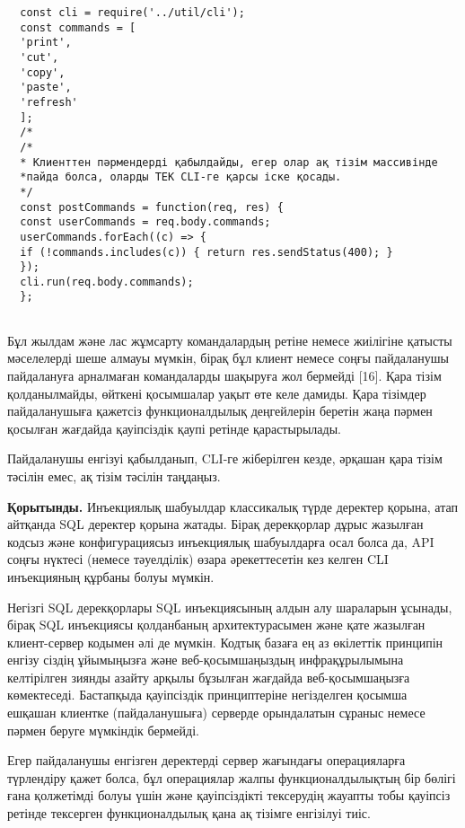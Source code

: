 \begin{verbatim}
  const cli = require('../util/cli');
  const commands = [
  'print',
  'cut',
  'copy',
  'paste',
  'refresh'
  ];
  /*
  /*
  * Клиенттен пәрмендерді қабылдайды, егер олар ақ тізім массивінде 
  *пайда болса, оларды ТЕК CLI-ге қарсы іске қосады.
  */
  const postCommands = function(req, res) {
  const userCommands = req.body.commands;
  userCommands.forEach((c) => {
  if (!commands.includes(c)) { return res.sendStatus(400); }
  });
  cli.run(req.body.commands);
  };
  

\end{verbatim}
\begin{multicols}{2}

Бұл жылдам және лас жұмсарту командалардың ретіне немесе жиілігіне
қатысты мәселелерді шеше алмауы мүмкін, бірақ бұл клиент немесе соңғы
пайдаланушы пайдалануға арналмаған командаларды шақыруға жол бермейді
{[}16{]}. Қара тізім қолданылмайды, өйткені қосымшалар уақыт өте келе
дамиды. Қара тізімдер пайдаланушыға қажетсіз функционалдылық деңгейлерін
беретін жаңа пәрмен қосылған жағдайда қауіпсіздік қаупі ретінде
қарастырылады.

Пайдаланушы енгізуі қабылданып, CLI-ге жіберілген кезде, әрқашан қара
тізім тәсілін емес, ақ тізім тәсілін таңдаңыз.

{\bfseries Қорытынды.} Инъекциялық шабуылдар классикалық түрде деректер
қорына, атап айтқанда SQL деректер қорына жатады. Бірақ дерекқорлар
дұрыс жазылған кодсыз және конфигурациясыз инъекциялық шабуылдарға осал
болса да, API соңғы нүктесі (немесе тәуелділік) өзара әрекеттесетін кез
келген CLI инъекцияның құрбаны болуы мүмкін.

Негізгі SQL дерекқорлары SQL инъекциясының алдын алу шараларын ұсынады,
бірақ SQL инъекциясы қолданбаның архитектурасымен және қате жазылған
клиент-сервер кодымен әлі де мүмкін. Кодтық базаға ең аз өкілеттік
принципін енгізу сіздің ұйымыңызға және веб-қосымшаңыздың
инфрақұрылымына келтірілген зиянды азайту арқылы бұзылған жағдайда
веб-қосымшаңызға көмектеседі. Бастапқыда қауіпсіздік принциптеріне
негізделген қосымша ешқашан клиентке (пайдаланушыға) серверде
орындалатын сұраныс немесе пәрмен беруге мүмкіндік бермейді.

Егер пайдаланушы енгізген деректерді сервер жағындағы операцияларға
түрлендіру қажет болса, бұл операциялар жалпы функционалдылықтың бір
бөлігі ғана қолжетімді болуы үшін және қауіпсіздікті тексерудің жауапты
тобы қауіпсіз ретінде тексерген функционалдылық қана ақ тізімге
енгізілуі тиіс.


\end{multicols}
